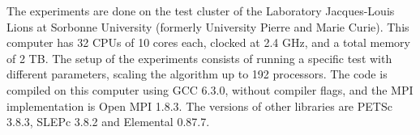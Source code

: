The experiments are done on the test cluster of the Laboratory Jacques-Louis Lions at Sorbonne University (formerly University Pierre and Marie Curie).
This computer has 32 CPUs of 10 cores each, clocked at 2.4 GHz, and a total memory of 2 TB.
The setup of the experiments consists of running a specific test with different parameters, scaling the algorithm up to 192 processors.
The code is compiled on this computer using GCC 6.3.0, without compiler flags, and the MPI implementation is Open MPI 1.8.3.
The versions of other libraries are PETSc 3.8.3, SLEPc 3.8.2 and Elemental 0.87.7.
